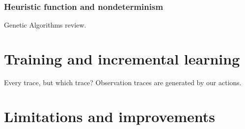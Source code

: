 
\subsubsection{Heuristic function and nondeterminism}


Genetic Algorithms review\cite{bib:ga-mutations-review}.

\section{Training and incremental learning}

Every trace, but which trace? Observation traces are generated by our actions.


\section{Limitations and improvements}

\label{sec:fluents-limitations}


